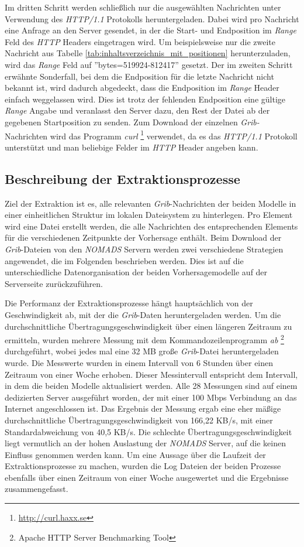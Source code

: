 Im dritten Schritt werden schließlich nur die ausgewählten Nachrichten
unter Verwendung des \textit{HTTP/1.1} Protokolls
heruntergeladen. Dabei wird pro Nachricht eine Anfrage an den Server
gesendet, in der die Start- und Endposition im \textit{Range} Feld des
\textit{HTTP} Headers eingetragen wird. Um beispielsweise nur die
zweite Nachricht aus Tabelle
\ref{tab:inhaltsverzeichnis_mit_positionen} herunterzuladen, wird das
\textit{Range} Feld auf ''bytes=519924-812417'' gesetzt. Der im
zweiten Schritt erwähnte Sonderfall, bei dem die Endposition für die
letzte Nachricht nicht bekannt ist, wird dadurch abgedeckt, dass die
Endposition im \textit{Range} Header einfach weggelassen wird. Dies
ist trotz der fehlenden Endposition eine gültige \textit{Range} Angabe
und veranlasst den Server dazu, den Rest der Datei ab der gegebenen
Startposition zu senden. Zum Download der einzelnen
\textit{Grib-}Nachrichten wird das Programm \textit{curl}
\footnote{\url{http://curl.haxx.se}} verwendet, da es das
\textit{HTTP/1.1} Protokoll unterstützt und man beliebige Felder im
\textit{HTTP} Header angeben kann.

\subsection{Beschreibung der Extraktionsprozesse}
Ziel der Extraktion ist es, alle relevanten \textit{Grib}-Nachrichten
der beiden Modelle in einer einheitlichen Struktur im lokalen
Dateisystem zu hinterlegen. Pro Element wird eine Datei erstellt
werden, die alle Nachrichten des entsprechenden Elements für die
verschiedenen Zeitpunkte der Vorhersage enthält. Beim Download der
\textit{Grib}-Dateien von den \textit{NOMADS} Servern werden zwei
verschiedene Strategien angewendet, die im Folgenden beschrieben
werden. Dies ist auf die unterschiedliche Datenorganisation der beiden
Vorhersagemodelle auf der Serverseite zurückzuführen.

Die Performanz der Extraktionsprozesse hängt hauptsächlich von der
Geschwindigkeit ab, mit der die \textit{Grib}-Daten heruntergeladen
werden. Um die durchschnittliche Übertragungsgeschwindigkeit über
einen längeren Zeitraum zu ermitteln, wurden mehrere Messung mit dem
Kommandozeilenprogramm \textit{ab} \footnote{Apache HTTP Server
  Benchmarking Tool} durchgeführt, wobei jedes mal eine 32 MB große
\textit{Grib}-Datei heruntergeladen wurde. Die Messwerte wurden in
einem Intervall von 6 Stunden über einen Zeitraum von einer Woche
erhoben. Dieser Messintervall entspricht dem Intervall, in dem die
beiden Modelle aktualisiert werden. Alle 28 Messungen sind auf einem
dedizierten Server ausgeführt worden, der mit einer 100 Mbps
Verbindung an das Internet angeschlossen ist. Das Ergebnis der Messung
ergab eine eher mäßige durchschnittliche Übertragungsgeschwindigkeit
von 166,22 KB/s, mit einer Standardabweichung von 40,5 KB/s. Die
schlechte Übertragungsgeschwindigkeit liegt vermutlich an der hohen
Auslastung der \textit{NOMADS} Server, auf die keinen Einfluss
genommen werden kann. Um eine Aussage über die Laufzeit der
Extraktionsprozesse zu machen, wurden die Log Dateien der beiden
Prozesse ebenfalls über einen Zeitraum von einer Woche ausgewertet und
die Ergebnisse zusammengefasst.

